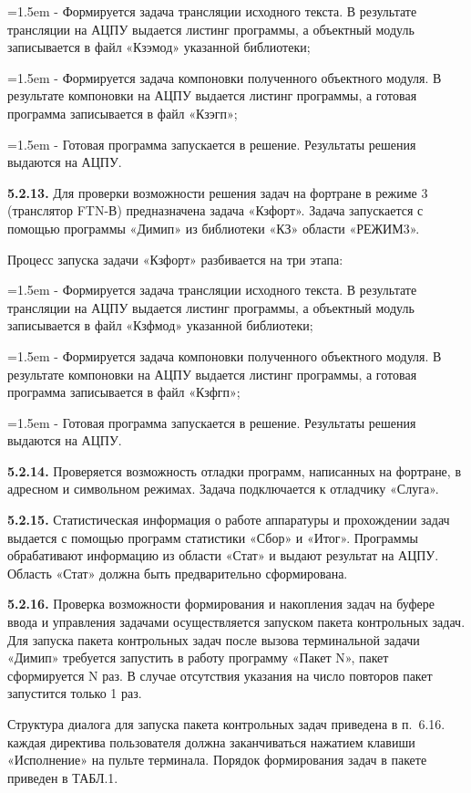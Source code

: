 \documentclass[11pt,a4paper]{article}
\begin{document}
\par\hangindent=1.5em - Формируется задача трансляции исходного текста. В результате трансляции на АЦПУ выдается листинг программы, а объектный модуль записывается в файл «Кзэмод» указанной библиотеки;\par
\par\hangindent=1.5em - Формируется задача компоновки полученного объектного модуля. В результате компоновки на АЦПУ выдается листинг программы, а готовая программа записывается в файл «Кзэгп»;\par
\par\hangindent=1.5em - Готовая программа запускается в решение. Результаты решения выдаются на АЦПУ.\par
\par\textbf{5.2.13.} Для проверки возможности решения задач на фортране в режиме 3 (транслятор FTN-В) предназначена задача «Кзфорт». Задача запускается с помощью программы «Димип» из библиотеки «КЗ» области «РЕЖИМ3».\par
Процесс запуска задачи «Кзфорт» разбивается на три этапа:

\par\hangindent=1.5em - Формируется задача трансляции исходного текста. В результате трансляции на АЦПУ выдается листинг программы, а объектный модуль записывается в файл «Кзфмод» указанной библиотеки;\par
\par\hangindent=1.5em - Формируется задача компоновки полученного объектного модуля. В результате компоновки на АЦПУ выдается листинг программы, а готовая программа записывается в файл «Кзфгп»;\par
\par\hangindent=1.5em - Готовая программа запускается в решение. Результаты решения выдаются на АЦПУ.\par
\par\textbf{5.2.14.} Проверяется возможность отладки программ, написанных на фортране, в адресном и символьном режимах. Задача подключается к отладчику «Слуга».\par
\par\textbf{5.2.15.} Статистическая информация о работе аппаратуры и прохождении задач выдается с помощью программ статистики «Сбор» и «Итог». Программы обрабативают информацию из области «Стат» и выдают результат на АЦПУ. Область «Стат» должна быть предварительно сформирована.\par
\par\textbf{5.2.16.} Проверка возможности формирования и накопления задач на буфере ввода и управления задачами осуществляется запуском пакета контрольных задач. Для запуска пакета контрольных задач после вызова терминальной задачи «Димип» требуется запустить в работу программу «Пакет N», пакет сформируется N раз. В случае отсутствия указания на число повторов пакет запустится только 1 раз.\par
Структура диалога для запуска пакета контрольных задач приведена в п.~6.16. каждая директива пользователя должна заканчиваться нажатием клавиши «Исполнение» на пульте терминала. Порядок формирования задач в пакете приведен в ТАБЛ.1.
\end{document}
